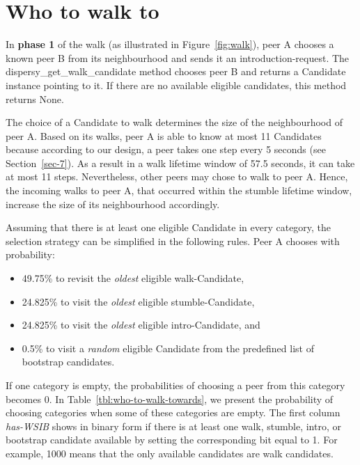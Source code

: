 \section{Who to walk to}
\label{sec-3}
In \textbf{phase 1} of the walk (as illustrated in Figure~\ref{fig:walk}), peer
A chooses a known peer B from its neighbourhood and sends it an
introduction-request.  The dispersy\_get\_walk\_candidate
method\footnotemark[3]{} chooses peer B and returns a Candidate instance
pointing to it.  If there are no available eligible candidates, this
method returns None.

The choice of a Candidate to walk determines the size of the
neighbourhood of peer A.  Based on its walks, peer A is able to know
at most 11 Candidates because according to our design, a peer takes
one step every 5 seconds (see Section~\ref{sec-7}).  As a result
in a walk lifetime window of 57.5 seconds, it can take at most 11
steps.  Nevertheless, other peers may chose to walk to peer A.  Hence,
the incoming walks to peer A, that occurred within the stumble
lifetime window, increase the size of its neighbourhood accordingly.

Assuming that there is at least one eligible Candidate in every
category, the selection strategy can be simplified in the following
rules.  Peer A chooses with probability:
\begin{itemize}
\item 49.75\% to revisit the \emph{oldest} eligible walk-Candidate,
\item 24.825\% to visit the \emph{oldest} eligible stumble-Candidate,
\item 24.825\% to visit the \emph{oldest} eligible intro-Candidate, and
\item 0.5\% to visit a \emph{random} eligible Candidate from the predefined list
of bootstrap candidates.
\end{itemize}

If one category is empty, the probabilities of choosing a peer from
this category becomes 0.  In Table~\ref{tbl:who-to-walk-towards}, we present
the probability of choosing categories when some of these categories
are empty.  The first column \emph{has-WSIB} shows in binary form if there
is at least one walk, stumble, intro, or bootstrap candidate available
by setting the corresponding bit equal to 1.  For example, 1000 means
that the only available candidates are walk candidates.

